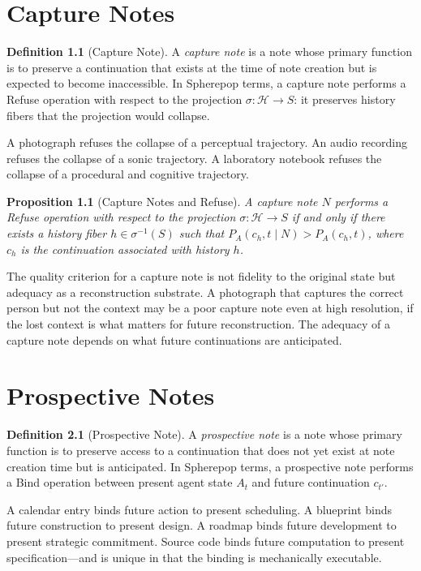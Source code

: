 \documentclass[12pt, a4paper, openany]{book}
\theoremstyle{plain}
\newtheorem{proposition}[theorem]{Proposition}
\theoremstyle{definition}
\newtheorem{definition}[theorem]{Definition}
\theoremstyle{remark}
\newcommand{\calH}{\mathcal{H}}
\begin{document}
\chapter{Capture Notes}

\begin{definition}[Capture Note]
A \emph{capture note} is a note whose primary function is to preserve a
continuation that exists at the time of note creation but is expected to become
inaccessible. In Spherepop terms, a capture note performs a Refuse operation
with respect to the projection $\sigma : \calH \to S$: it preserves history
fibers that the projection would collapse.
\end{definition}

A photograph refuses the collapse of a perceptual trajectory. An audio recording
refuses the collapse of a sonic trajectory. A laboratory notebook refuses the
collapse of a procedural and cognitive trajectory.

\begin{proposition}[Capture Notes and Refuse]
A capture note $N$ performs a Refuse operation with respect to the projection
$\sigma : \calH \to S$ if and only if there exists a history fiber
$h \in \sigma^{-1}(S)$ such that $P_A(c_h, t \mid N) > P_A(c_h, t)$, where
$c_h$ is the continuation associated with history $h$.
\end{proposition}

The quality criterion for a capture note is not fidelity to the original state
but adequacy as a reconstruction substrate. A photograph that captures the correct
person but not the context may be a poor capture note even at high resolution, if
the lost context is what matters for future reconstruction. The adequacy of a
capture note depends on what future continuations are anticipated.

\chapter{Prospective Notes}

\begin{definition}[Prospective Note]
A \emph{prospective note} is a note whose primary function is to preserve access
to a continuation that does not yet exist at note creation time but is anticipated.
In Spherepop terms, a prospective note performs a Bind operation between present
agent state $A_t$ and future continuation $c_{t'}$.
\end{definition}

A calendar entry binds future action to present scheduling. A blueprint binds
future construction to present design. A roadmap binds future development to
present strategic commitment. Source code binds future computation to present
specification---and is unique in that the binding is mechanically executable.
\end{document}
